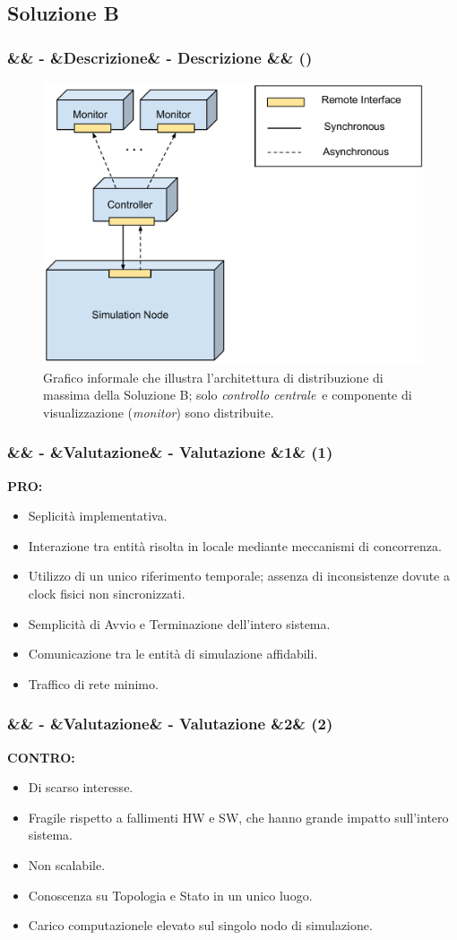 \documentclass[slidestop,compress,blackandwhite]{beamer}
\newcommand{\ii}[1]{\textit{#1}}
\newcommand{\controller}{\ii{controllo centrale}}
\newcommand{\PRO}{\textbf{PRO:}}
\newcommand{\CONTRO}{\textbf{CONTRO:}}
\newcommand{\cm}[1]{\vspace{#1cm}}
\newcommand{\newtitle}[4]{
	#1 
	\ifx&#2&%
	\else
  		\large- #2
	\fi
	\ifx&#3&%
	\else
  		\normalsize- #3
	\fi
	\ifx&#4&%
	\else
  		\normalsize (#4)
	\fi
}
\newcommand{\newframe}[5]{
	\begin{frame}
		\frametitle{\newtitle{#1}{#2}{#3}{#4}}
		#5
	\end{frame}
}
\begin{document}
	\subsection{Soluzione B}\label{sol_b}
	\newframe{}{}{Descrizione}{}{
		\begin{figure}
			\includegraphics[scale=0.22,trim=0mm 0mm 0mm 0mm]{imgs/nothing_distributed.pdf}
			\caption{\small Grafico informale che illustra l'architettura di distribuzione di massima della Soluzione B; solo \controller~e componente di visualizzazione (\ii{monitor}) sono distribuite.}
		\end{figure}
		
	}
	
	\newframe{}{}{Valutazione}{1}{
		\vspace{0.5cm}
		\PRO
			\begin{itemize}
				\item Seplicità implementativa.
				\item Interazione tra entità risolta in locale mediante meccanismi di concorrenza.
				\item Utilizzo di un unico riferimento temporale; assenza di inconsistenze dovute a clock fisici non sincronizzati.
				\item Semplicità di Avvio e Terminazione dell'intero sistema.
				\item Comunicazione tra le entità di simulazione affidabili.
				\item Traffico di rete minimo.
			\end{itemize}
	}
	
	
	\newframe{}{}{Valutazione}{2}{
		\cm{0.5}
		\CONTRO
			\begin{itemize}
				\item Di scarso interesse.
				\item Fragile rispetto a fallimenti HW e SW, che hanno grande impatto sull'intero sistema.
				\item Non scalabile.
				\item Conoscenza su Topologia e Stato in un unico luogo.
				\item Carico computazionele elevato sul singolo nodo di simulazione.
			\end{itemize}
	}
	
\end{document}
